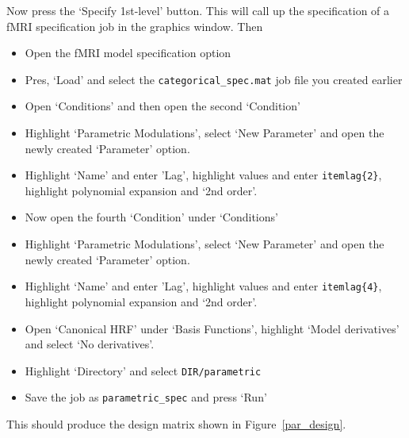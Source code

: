 \documentclass[a4paper,titlepage]{book}
\newcommand{\bi}{\begin{itemize}}
\newcommand{\ei}{\end{itemize}}
\begin{document}
Now press the `Specify 1st-level' button. This will call up the specification of a fMRI specification job in the graphics window. Then
\bi
\item{Open the fMRI model specification option}
\item{Pres, `Load' and select the \verb!categorical_spec.mat! job file you created earlier}
\item{Open `Conditions' and then open the second `Condition'}
\item{Highlight `Parametric Modulations', select `New Parameter' and open the newly created `Parameter' option.}
\item{Highlight `Name' and enter 'Lag', highlight values and enter \verb!itemlag{2}!, highlight polynomial expansion and `2nd order'.}
\item{Now open the fourth `Condition' under `Conditions'}
\item{Highlight `Parametric Modulations', select `New Parameter' and open the newly created `Parameter' option.}
\item{Highlight `Name' and enter 'Lag', highlight values and enter \verb!itemlag{4}!, highlight polynomial expansion and `2nd order'.}
\item{Open `Canonical HRF' under `Basis Functions', highlight `Model derivatives' and select 
`No derivatives'.}
\item{Highlight `Directory' and select \verb!DIR/parametric!}
\item{Save the job as \verb!parametric_spec! and press `Run'}
\ei
This should produce the design matrix shown in Figure~\ref{par_design}.
\end{document}
